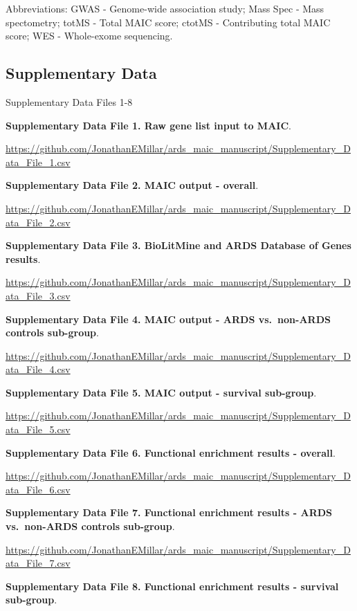 \documentclass[
  11,
  a4paper,
]{article}
\begin{document}
\begin{scriptsize}
Abbreviations: GWAS - Genome-wide association study; Mass Spec - Mass spectometry; totMS - Total MAIC score; ctotMS - Contributing total MAIC score; WES - Whole-exome sequencing.
\end{scriptsize}

\newpage

\subsection{Supplementary Data}\label{supplementary-data}

Supplementary Data Files 1-8

\newpage

\textbf{Supplementary Data File 1. Raw gene list input to MAIC}.

\url{https://github.com/JonathanEMillar/ards_maic_manuscript/Supplementary_Data_File_1.csv}

\textbf{Supplementary Data File 2. MAIC output - overall}.

\url{https://github.com/JonathanEMillar/ards_maic_manuscript/Supplementary_Data_File_2.csv}

\textbf{Supplementary Data File 3. BioLitMine and ARDS Database of Genes
results}.

\url{https://github.com/JonathanEMillar/ards_maic_manuscript/Supplementary_Data_File_3.csv}

\textbf{Supplementary Data File 4. MAIC output - ARDS vs.~non-ARDS
controls sub-group}.

\url{https://github.com/JonathanEMillar/ards_maic_manuscript/Supplementary_Data_File_4.csv}

\textbf{Supplementary Data File 5. MAIC output - survival sub-group}.

\url{https://github.com/JonathanEMillar/ards_maic_manuscript/Supplementary_Data_File_5.csv}

\textbf{Supplementary Data File 6. Functional enrichment results -
overall}.

\url{https://github.com/JonathanEMillar/ards_maic_manuscript/Supplementary_Data_File_6.csv}

\textbf{Supplementary Data File 7. Functional enrichment results - ARDS
vs.~non-ARDS controls sub-group}.

\url{https://github.com/JonathanEMillar/ards_maic_manuscript/Supplementary_Data_File_7.csv}

\textbf{Supplementary Data File 8. Functional enrichment results -
survival sub-group}.
\end{document}
